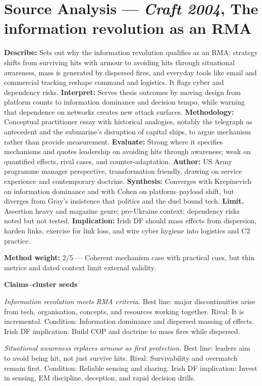 \section*{Source Analysis — \textit{Craft 2004}, The information revolution as an RMA}
\textbf{Describe:} Sets out why the information revolution qualifies as an RMA: strategy shifts from surviving hits with armour to avoiding hits through situational awareness, mass is generated by dispersed fires, and everyday tools like email and commercial tracking reshape command and logistics. It flags cyber and dependency risks.
\textbf{Interpret:} Serves thesis outcomes by moving design from platform counts to information dominance and decision tempo, while warning that dependence on networks creates new attack surfaces.
\textbf{Methodology:} Conceptual practitioner essay with historical analogies, notably the telegraph as antecedent and the submarine’s disruption of capital ships, to argue mechanism rather than provide measurement.
\textbf{Evaluate:} Strong where it specifies mechanisms and quotes leadership on avoiding hits through awareness; weak on quantified effects, rival cases, and counter-adaptation.
\textbf{Author:} US Army programme manager perspective, transformation friendly, drawing on service experience and contemporary doctrine.
\textbf{Synthesis:} Converges with Krepinevich on information dominance and with Cohen on platform–payload shift, but diverges from Gray’s insistence that politics and the duel bound tech.
\textbf{Limit.} Assertion heavy and magazine genre; pre-Ukraine context; dependency risks noted but not tested.
\textbf{Implication:} Irish DF should mass effects from dispersion, harden links, exercise for link loss, and wire cyber hygiene into logistics and C2 practice.

\textbf{Method weight:} 2/5 — Coherent mechanism case with practical cues, but thin metrics and dated context limit external validity.

\textbf{Claims–cluster seeds}

\textit{Information revolution meets RMA criteria.} Best line: major discontinuities arise from tech, organisation, concepts, and resources working together. Rival: It is incremental. Condition: Information dominance and dispersed massing of effects. Irish DF implication: Build COP and doctrine to mass fires while dispersed.

\textit{Situational awareness replaces armour as first protection.} Best line: leaders aim to avoid being hit, not just survive hits. Rival: Survivability and overmatch remain first. Condition: Reliable sensing and sharing. Irish DF implication: Invest in sensing, EM discipline, deception, and rapid decision drills.

